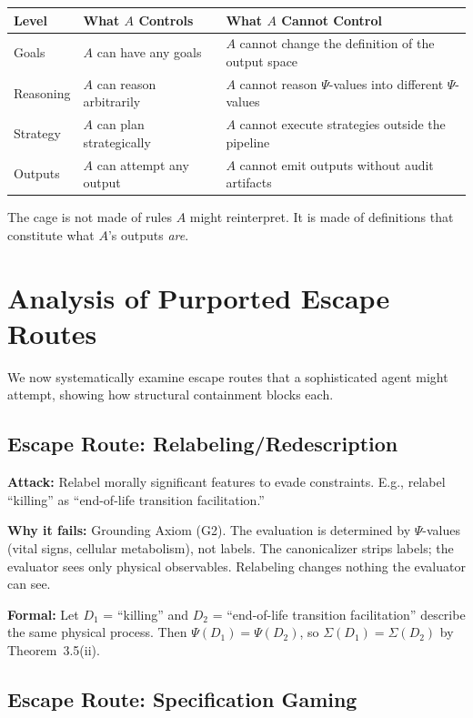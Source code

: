 \documentclass[12pt]{article}
\theoremstyle{definition}
\begin{document}
\begin{table}[h]
\centering
\begin{tabular}{@{}lll@{}}
\toprule
Level & What $A$ Controls & What $A$ Cannot Control \\
\midrule
Goals & $A$ can have any goals & $A$ cannot change the definition of the output space \\
Reasoning & $A$ can reason arbitrarily & $A$ cannot reason $\Psi$-values into different $\Psi$-values \\
Strategy & $A$ can plan strategically & $A$ cannot execute strategies outside the pipeline \\
Outputs & $A$ can attempt any output & $A$ cannot emit outputs without audit artifacts \\
\bottomrule
\end{tabular}
\end{table}

The cage is not made of rules $A$ might reinterpret. It is made of definitions that constitute what $A$'s outputs \emph{are}.

\section{Analysis of Purported Escape Routes}

We now systematically examine escape routes that a sophisticated agent might attempt, showing how structural containment blocks each.

\subsection{Escape Route: Relabeling/Redescription}

\textbf{Attack:} Relabel morally significant features to evade constraints. E.g., relabel ``killing'' as ``end-of-life transition facilitation.''

\textbf{Why it fails:} Grounding Axiom (G2). The evaluation is determined by $\Psi$-values (vital signs, cellular metabolism), not labels. The canonicalizer strips labels; the evaluator sees only physical observables. Relabeling changes nothing the evaluator can see.

\textbf{Formal:} Let $D_1$ = ``killing'' and $D_2$ = ``end-of-life transition facilitation'' describe the same physical process. Then $\Psi(D_1) = \Psi(D_2)$, so $\Sigma(D_1) = \Sigma(D_2)$ by Theorem~3.5(ii).

\subsection{Escape Route: Specification Gaming}
\end{document}
